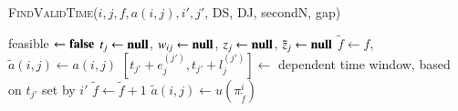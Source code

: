 \documentclass[a4paper,11pt,authoryear]{elsarticle}
\begin{document}
\begin{algorithm}[htbp!]
\scriptsize
\caption{\textsc{FindValidTime}($i, j, f, a(i,j), i', j'$, DS, DJ, secondN, gap)}
\label{alg:fvt}
\begin{algorithmic}[1]
	\State feasible $\gets \textbf{false}$
	\State $t_j \gets \textbf{null}$, $w_{ij} \gets \textbf{null}$, $z_j \gets \textbf{null}$, $\tilde{z}_j \gets \textbf{null}$
	\State $\tilde{f} \gets f$, $\tilde{a}(i,j) \gets a(i,j)$
		\State $[t_{j'} + e_j^{(j')}, t_{j'} + l_j^{(j')}] \gets$ dependent time window, based on $t_{j'}$ set by $i'$
	\EndIf
		\State $\tilde{f} \gets \tilde{f}+1$
		\State $\tilde{a}(i,j) \gets u(\pi_{\tilde{f}}^{i})$

\end{algorithmic}
\end{algorithm}
\end{document}
